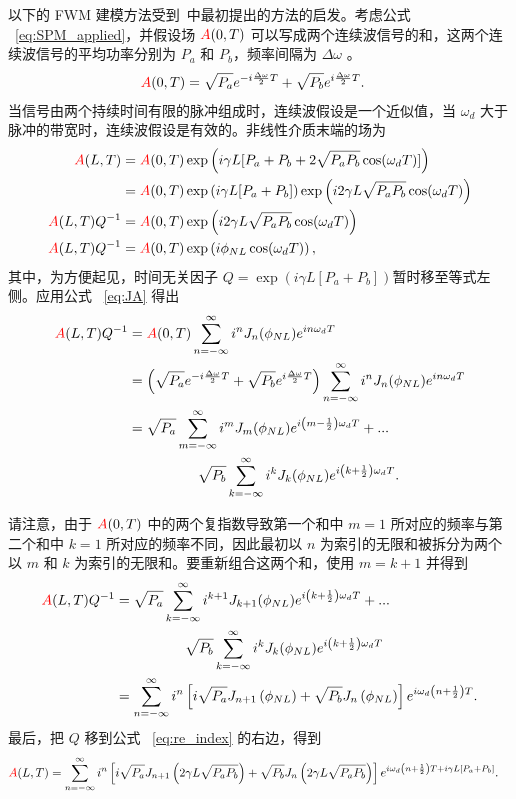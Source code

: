 以下的 FWM 建模方法受到~\cite{Boskovic_Original_Kerr_Effect}中最初提出的方法的启发。考虑公式 ~\ref{eq:SPM_applied}，并假设场 $\textcolor{red}{A}(0,T)$ 可以写成两个连续波信号的和，这两个连续波信号的平均功率分别为 $P_a$ 和 $P_b$，频率间隔为 $\Delta\omega$ 。
\begin{align}
    \label{eq:FWM_input}
    \textcolor{red}{A}(0,T)&= \sqrt{P_a}e^{-i\frac{\Delta\omega}{2}T}+\sqrt{P_b}e^{i\frac{\Delta\omega}{2}T}.
\end{align}
当信号由两个持续时间有限的脉冲组成时，连续波假设是一个近似值，当 $\omega_d$ 大于脉冲的带宽时，连续波假设是有效的。非线性介质末端的场为
\begin{align}
    \textcolor{red}{A}(L,T) &= \textcolor{red}{A}(0,T)\exp\left(i\gamma L [P_a+P_b+2\sqrt{P_aP_b}\cos(\omega_dT)] \right) \\ \nonumber
    &= \textcolor{red}{A}(0,T)\exp\left(i\gamma L [P_a+P_b]\right)\exp\left(i2\gamma L\sqrt{P_aP_b}\cos(\omega_dT) \right)\\ \nonumber
    \textcolor{red}{A}(L,T)Q^{-1}&= \textcolor{red}{A}(0,T)\exp\left(i2\gamma L\sqrt{P_aP_b}\cos(\omega_dT) \right)\\ \nonumber
    \textcolor{red}{A}(L,T)Q^{-1}&= \textcolor{red}{A}(0,T)\exp\left(i\phi_{NL}\cos(\omega_dT) \right),
\end{align}
其中，为方便起见，时间无关因子 $Q=\exp(i\gamma L [P_a+P_b])$暂时移至等式左侧。应用公式 ~\ref{eq:JA} 得出
\begin{align}
    \textcolor{red}{A}(L,T)Q^{-1}&= \textcolor{red}{A}(0,T)\sum_{n=-\infty}^{\infty}i^nJ_n(\phi_{NL})e^{in\omega_dT} \\ \nonumber
    &=\left(\sqrt{P_a}e^{-i\frac{\Delta\omega}{2}T}+\sqrt{P_b}e^{i\frac{\Delta\omega}{2}T}\right)\sum_{n=-\infty}^{\infty}i^nJ_n(\phi_{NL})e^{in\omega_dT} \\ \nonumber
    &=\sqrt{P_a}\sum_{m=-\infty}^{\infty}i^mJ_m(\phi_{NL})e^{i\left(m-\frac{1}{2}\right)\omega_dT}+...\\ \nonumber & \quad\quad\quad\quad\quad\sqrt{P_b}\sum_{k=-\infty}^{\infty}i^kJ_k(\phi_{NL})e^{i\left(k+\frac{1}{2}\right)\omega_dT}.
\end{align}

请注意，由于 $\textcolor{red}{A}(0,T)$ 中的两个复指数导致第一个和中 $m=1$ 所对应的频率与第二个和中 $k=1$ 所对应的频率不同，因此最初以 $n$ 为索引的无限和被拆分为两个以 $m$ 和 $k$ 为索引的无限和。要重新组合这两个和，使用 $m=k+1$ 并得到
\begin{align}
\label{eq:re_index}
    \textcolor{red}{A}(L,T)Q^{-1}&=\sqrt{P_a}\sum_{k=-\infty}^{\infty}i^{k+1}J_{k+1}(\phi_{NL})e^{i\left(k+\frac{1}{2}\right)\omega_dT}+...\\ \nonumber & \quad\quad\quad\quad\quad\sqrt{P_b}\sum_{k=-\infty}^{\infty}i^kJ_k(\phi_{NL})e^{i\left(k+\frac{1}{2}\right)\omega_dT} \\ \nonumber
    &= \sum_{n=-\infty}^{\infty} i^n\left[i\sqrt{P_a}J_{n+1}\left(\phi_{NL}\right)+\sqrt{P_b}J_n\left(\phi_{NL}\right)\right]e^{i\omega_d\left(n+\frac{1}{2}\right)T}.
\end{align}
最后，把 $Q$ 移到公式 ~\ref{eq:re_index} 的右边，得到
\begin{align}
\label{eq:FWM_general}
    \textcolor{red}{A}(L,T)&=\sum_{n=-\infty}^{\infty} i^n\left[i\sqrt{P_a}J_{n+1}\left(2\gamma L\sqrt{P_aP_b}\right)+\sqrt{P_b}J_n\left(2\gamma L\sqrt{P_aP_b}\right)\right]e^{i\omega_d\left(n+\frac{1}{2}\right)T+i\gamma L[P_a+P_b]}.
\end{align}


